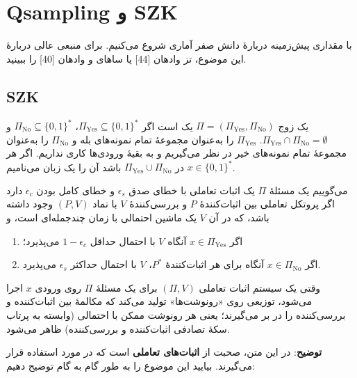 \section{ Qsampling و SZK}

با مقداری پیش‌زمینه دربارهٔ دانش صفر آماری شروع می‌کنیم. برای منبعی عالی دربارهٔ این موضوع، تز وادهان [44] یا ساهای و وادهان [40] را ببینید.

\subsection{SZK}

یک زوج $\Pi = (\Pi_{\mathrm{Yes}}, \Pi_{\mathrm{No}})$ یک 
 است اگر $\Pi_{\mathrm{Yes}} \subseteq \{0,1\}^*$، $\Pi_{\mathrm{No}} \subseteq \{0,1\}^*$ و $\Pi_{\mathrm{Yes}} \cap \Pi_{\mathrm{No}} = \emptyset$. $\Pi_{\mathrm{Yes}}$ را به‌عنوان مجموعهٔ تمام نمونه‌های بله و $\Pi_{\mathrm{No}}$ را به‌عنوان مجموعهٔ تمام نمونه‌های خیر در نظر می‌گیریم و به بقیهٔ ورودی‌ها کاری نداریم. اگر هر $x \in \{0,1\}^*$ در $\Pi_{\mathrm{Yes}} \cup \Pi_{\mathrm{No}}$ باشد آن را یک زبان می‌نامیم.

می‌گوییم یک مسئلهٔ  $\Pi$ یک اثبات تعاملی با خطای صدق $\epsilon_s$ و خطای کامل بودن $\epsilon_c$ دارد اگر پروتکل تعاملی بین اثبات‌کنندهٔ $P$ و بررسی‌کنندهٔ $V$ با نماد $(P,V)$ وجود داشته باشد، که در آن $V$ یک ماشین احتمالی با زمان چندجمله‌ای است، و 
\begin{enumerate}
	\item 
	اگر $x \in \Pi_{\mathrm{Yes}}$ آنگاه $V$ با احتمال حداقل $1 - \epsilon_c$ می‌پذیرد؛ 
	\item
	اگر $x \in \Pi_{\mathrm{No}}$ آنگاه برای هر اثبات‌کنندهٔ $P^*$، $V$ با احتمال حداکثر $\epsilon_s$ می‌پذیرد. 
\end{enumerate}
وقتی یک سیستم اثبات تعاملی $(\Pi, V)$ برای یک مسئلهٔ  $\Pi$ روی ورودی $x$ اجرا می‌شود، توزیعی روی «رونوشت‌ها» تولید می‌کند که مکالمهٔ بین اثبات‌کننده و بررسی‌کننده را در بر می‌گیرند؛ یعنی هر رونوشت ممکن با احتمالی (وابسته به پرتاب سکهٔ تصادفی اثبات‌کننده و بررسی‌کننده) ظاهر می‌شود.

\textbf{توضیح}: 
	در این متن، صحبت از \textbf{اثبات‌های تعاملی} است که در 
	 مورد استفاده قرار می‌گیرند. بیایید این موضوع را به طور گام به گام توضیح دهیم:
	
